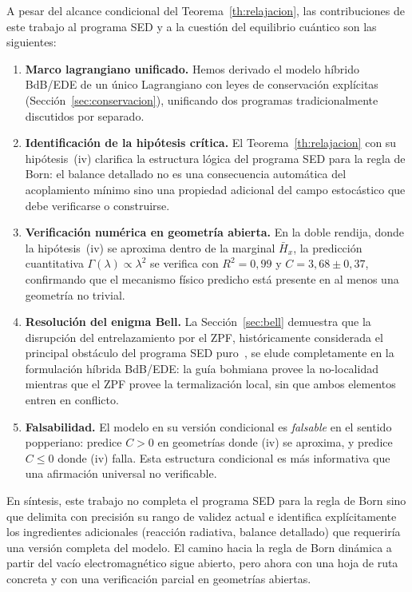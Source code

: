 \documentclass[11pt,a4paper]{article}
\begin{document}
A pesar del alcance condicional del Teorema~\ref{th:relajacion}, las
contribuciones de este trabajo al programa SED y a la cuestión del
equilibrio cuántico son las siguientes:
\begin{enumerate}
\item \textbf{Marco lagrangiano unificado.} Hemos derivado el modelo
híbrido BdB/EDE de un único Lagrangiano con leyes de conservación
explícitas (Sección~\ref{sec:conservacion}), unificando dos programas
tradicionalmente discutidos por separado.
\item \textbf{Identificación de la hipótesis crítica.} El
Teorema~\ref{th:relajacion} con su hipótesis~(iv) clarifica la
estructura lógica del programa SED para la regla de Born: el balance
detallado no es una consecuencia automática del acoplamiento mínimo
sino una propiedad adicional del campo estocástico que debe verificarse
o construirse.
\item \textbf{Verificación numérica en geometría abierta.} En la doble
rendija, donde la hipótesis~(iv) se aproxima dentro de la marginal
$\bar{H}_x$, la predicción cuantitativa $\Gamma(\lambda)\propto\lambda^2$
se verifica con $R^2=0{,}99$ y $C=3{,}68\pm 0{,}37$, confirmando que el
mecanismo físico predicho está presente en al menos una geometría no
trivial.
\item \textbf{Resolución del enigma Bell.} La Sección~\ref{sec:bell}
demuestra que la disrupción del entrelazamiento por el ZPF,
históricamente considerada el principal obstáculo del programa SED
puro~\cite{delaPenaCetto1996,Marshall1980}, se elude completamente en
la formulación híbrida BdB/EDE: la guía bohmiana provee la
no-localidad mientras que el ZPF provee la termalización local, sin
que ambos elementos entren en conflicto.
\item \textbf{Falsabilidad.} El modelo en su versión condicional es
\emph{falsable} en el sentido popperiano: predice $C>0$ en geometrías
donde (iv) se aproxima, y predice $C\leq 0$ donde (iv) falla. Esta
estructura condicional es más informativa que una afirmación universal
no verificable.
\end{enumerate}

En síntesis, este trabajo no completa el programa SED para la regla de
Born sino que delimita con precisión su rango de validez actual e
identifica explícitamente los ingredientes adicionales (reacción
radiativa, balance detallado) que requeriría una versión completa del
modelo. El camino hacia la regla de Born dinámica a partir del vacío
electromagnético sigue abierto, pero ahora con una hoja de ruta
concreta y con una verificación parcial en geometrías abiertas.
\end{document}
